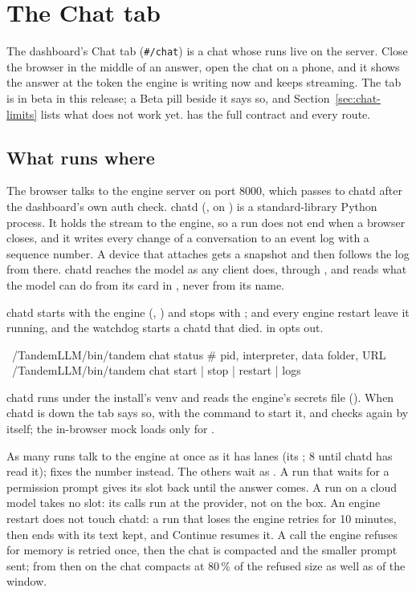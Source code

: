\chapter{The Chat tab}\label{ch:chat}

The dashboard's Chat tab (\texttt{\#/chat}) is a chat whose runs live on the server. Close the browser in the middle of an answer, open the chat on a phone, and it shows the answer at the token the engine is writing now and keeps streaming. The tab is in beta in this release; a Beta pill beside it says so, and Section~\ref{sec:chat-limits} lists what does not work yet.  has the full contract and every route.

\section{What runs where}

The browser talks to the engine server on port 8000, which passes  to chatd after the dashboard's own auth check. chatd (, on ) is a standard-library Python process. It holds the stream to the engine, so a run does not end when a browser closes, and it writes every change of a conversation to an event log with a sequence number. A device that attaches gets a snapshot and then follows the log from there. chatd reaches the model as any client does, through , and reads what the model can do from its card in , never from its name.

chatd starts with the engine (, ) and stops with ;  and every engine restart leave it running, and the watchdog starts a chatd that died.  in  opts out.

\begin{shell}
~/TandemLLM/bin/tandem chat status   # pid, interpreter, data folder, URL
~/TandemLLM/bin/tandem chat start | stop | restart | logs
\end{shell}

chatd runs under the install's venv and reads the engine's secrets file (). When chatd is down the tab says so, with the command to start it, and checks again by itself; the in-browser mock loads only for .

As many runs talk to the engine at once as it has lanes (its  ; 8 until chatd has read it);  fixes the number instead. The others wait as . A run that waits for a permission prompt gives its slot back until the answer comes. A run on a cloud model takes no slot: its calls run at the provider, not on the box. An engine restart does not touch chatd: a run that loses the engine retries for 10 minutes, then ends  with its text kept, and Continue resumes it. A call the engine refuses for memory is retried once, then the chat is compacted and the smaller prompt sent; from then on the chat compacts at 80\,\% of the refused size as well as of the window.

